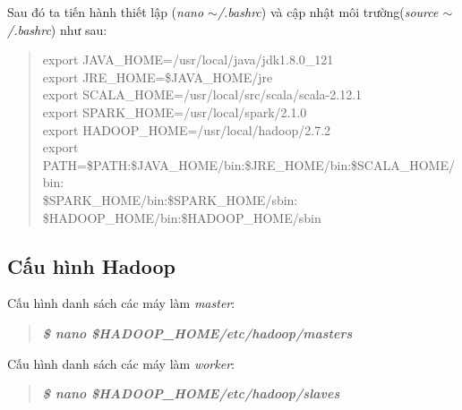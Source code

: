 Sau đó ta tiến hành thiết lập (\textit{nano $\sim$/.bashrc}) và cập nhật môi trường(\textit{source $\sim$/.bashrc}) như sau:
\begin{quote}
	export JAVA\_HOME=/usr/local/java/jdk1.8.0\_121\\
	export JRE\_HOME=\$JAVA\_HOME/jre\\
	export SCALA\_HOME=/usr/local/src/scala/scala-2.12.1\\
	export SPARK\_HOME=/usr/local/spark/2.1.0\\
	export HADOOP\_HOME=/usr/local/hadoop/2.7.2\\	export PATH=\$PATH:\$JAVA\_HOME/bin:\$JRE\_HOME/bin:\$SCALA\_HOME/bin:\\
	\$SPARK\_HOME/bin:\$SPARK\_HOME/sbin:\\
	\$HADOOP\_HOME/bin:\$HADOOP\_HOME/sbin
\end{quote}
\subsection{Cấu hình Hadoop}
Cấu hình danh sách các máy làm \textit{master}:
\begin{quote}
	\textbf{\textit{\$ nano \$HADOOP\_HOME/etc/hadoop/masters}}
\end{quote}

Cấu hình danh sách các máy làm \textit{worker}:
\begin{quote}
	\textbf{\textit{\$ nano \$HADOOP\_HOME/etc/hadoop/slaves}}
\end{quote}


